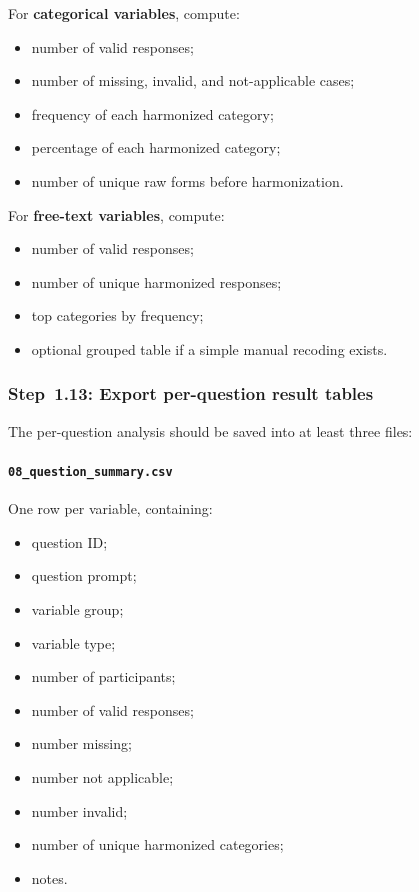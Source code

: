 For \textbf{categorical variables}, compute:
\begin{itemize}
    \item number of valid responses;
    \item number of missing, invalid, and not-applicable cases;
    \item frequency of each harmonized category;
    \item percentage of each harmonized category;
    \item number of unique raw forms before harmonization.
\end{itemize}

For \textbf{free-text variables}, compute:
\begin{itemize}
    \item number of valid responses;
    \item number of unique harmonized responses;
    \item top categories by frequency;
    \item optional grouped table if a simple manual recoding exists.
\end{itemize}

\subsubsection{Step~1.13: Export per-question result tables}
The per-question analysis should be saved into at least three files:

\paragraph{\texttt{08\_question\_summary.csv}}
One row per variable, containing:
\begin{itemize}
    \item question ID;
    \item question prompt;
    \item variable group;
    \item variable type;
    \item number of participants;
    \item number of valid responses;
    \item number missing;
    \item number not applicable;
    \item number invalid;
    \item number of unique harmonized categories;
    \item notes.
\end{itemize}


